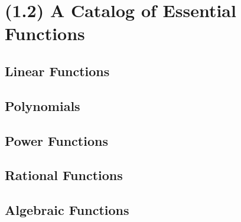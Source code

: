 \documentclass{beamer}
\theoremstyle{partialproof} \newtheorem{partialproof}[theorem]{Proof.}
\begin{document}
\section{(1.2) A Catalog of Essential Functions}
\subsection{Linear Functions}

\subsection{Polynomials}

\subsection{Power Functions}





\subsection{Rational Functions}

\subsection{Algebraic Functions}

\end{document}
